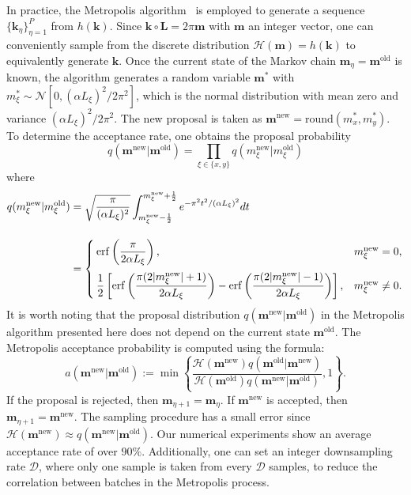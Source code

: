 In practice, the Metropolis algorithm~\cite{metropolis1953equation, hastings1970monte} is employed to generate a sequence $\{\bm{k}_{\eta}\}_{\eta=1}^{P}$ from $h(\bm{k})$. 
Since $\bm{k}\circ \bm{L}=2\pi \bm{m}$ with $\bm{m}$ an integer vector, one can conveniently sample from the discrete distribution $\mathcal{H}(\bm{m})=h(\bm{k})$ to equivalently generate $\bm{k}$. 
Once the current state of the Markov chain $\bm{m}_{\eta}=\bm{m}^{\text{old}}$ is known, the algorithm generates a random variable $\bm{m}^*$ with $m_{\xi}^*\sim \mathcal{N}[0,(\alpha L_{\xi})^2/2\pi^2]$, which is the normal distribution with mean zero and variance $(\alpha L_{\xi})^2/2\pi^2$. The new proposal is taken as $\bm{m}^{\text{new}}=\text{round}(m_{x}^*,m_{y}^*)$. To determine the acceptance rate, one obtains the proposal probability 
\begin{equation}
	q(\bm{m}^{\text{new}}|\bm{m}^{\text{old}})=\prod_{\xi\in\{x,y\}}q(m^{\text{new}}_{\xi}|m^{\text{old}}_{\xi})
\end{equation}
where
\begin{equation}
	\begin{split}
		q(m^{\text{new}}_{\xi}|m^{\text{old}}_{\xi})&=\sqrt{\frac{\pi}{(\alpha L_{\xi})^2}}\int_{m^{\text{new}}_{\xi}-\frac{1}{2}}^{m^{\text{new}}_{\xi}+\frac{1}{2}}e^{-\pi^2t^2/(\alpha L_{\xi})^2}dt\\[1em]
		&=\begin{cases}
			\operatorname{erf}\left(\dfrac{\pi}{2\alpha L_{\xi}}\right),&m_{\xi}^{\text{new}}=0,\\[1.15em]
			\dfrac{1}{2}\left[\operatorname{erf}\left(\dfrac{\pi(2|m_{\xi}^{\text{new}}|+1)}{2\alpha L_{\xi}}\right)-\operatorname{erf}\left(\dfrac{\pi(2|m_{\xi}^{\text{new}}|-1)}{2\alpha L_{\xi}}\right)\right],&m_{\xi}^{\text{new}}\neq 0.
		\end{cases}
	\end{split}
\end{equation}
It is worth noting that the proposal distribution $q(\bm{m}^{\text{new}}|\bm{m}^{\text{old}})$ in the Metropolis algorithm presented here does not depend on the current state $\bm{m}^{\text{old}}$. The Metropolis acceptance probability is computed using the formula:
\begin{equation}
	a(\bm{m}^{\text{new}}|\bm{m}^{\text{old}}):=\min\left\{\frac{\mathcal{H}(\bm{m}^{\text{new}})q(\bm{m}^{\text{old}}|\bm{m}^{\text{new}})}{\mathcal{H}(\bm{m}^{\text{old}})q(\bm{m}^{\text{new}}|\bm{m}^{\text{old}})},1\right\}.
\end{equation}
If the proposal is rejected, then $\bm{m}_{\eta+1}=\bm{m}_{\eta}$. If $\bm{m}^{\text{new}}$ is accepted, then $\bm{m}_{\eta+1}=\bm{m}^{\text{new}}$. The sampling procedure has a small error since $\mathcal{H}(\bm{m}^{\text{new}})\approx q(\bm{m}^{\text{new}}|\bm{m}^{\text{old}})$. Our numerical experiments show an average acceptance rate of over $90\%$. Additionally, one can set an integer downsampling rate $\mathscr{D}$, where only one sample is taken from every $\mathscr{D}$ samples, to reduce the correlation between batches in the Metropolis process.